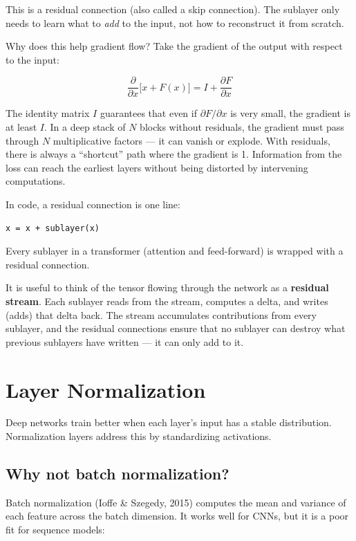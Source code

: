 This is a residual connection (also called a skip connection). The sublayer only needs to learn what to \textit{add} to the input, not how to reconstruct it from scratch.

Why does this help gradient flow? Take the gradient of the output with respect to the input:

\[
\frac{\partial}{\partial x}\bigl[x + F(x)\bigr] = I + \frac{\partial F}{\partial x}
\]

The identity matrix $I$ guarantees that even if $\partial F / \partial x$ is very small, the gradient is at least $I$. In a deep stack of $N$ blocks without residuals, the gradient must pass through $N$ multiplicative factors --- it can vanish or explode. With residuals, there is always a ``shortcut'' path where the gradient is 1. Information from the loss can reach the earliest layers without being distorted by intervening computations.

In code, a residual connection is one line:

\concepttag
\begin{lstlisting}
x = x + sublayer(x)
\end{lstlisting}

Every sublayer in a transformer (attention and feed-forward) is wrapped with a residual connection.

It is useful to think of the tensor flowing through the network as a \textbf{residual stream}. Each sublayer reads from the stream, computes a delta, and writes (adds) that delta back. The stream accumulates contributions from every sublayer, and the residual connections ensure that no sublayer can destroy what previous sublayers have written --- it can only add to it.

\section{Layer Normalization}

Deep networks train better when each layer's input has a stable distribution. Normalization layers address this by standardizing activations.

\subsection{Why not batch normalization?}

Batch normalization (Ioffe \& Szegedy, 2015) computes the mean and variance of each feature across the batch dimension. It works well for CNNs, but it is a poor fit for sequence models:

